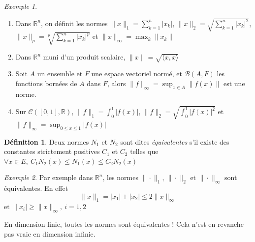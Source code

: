 \documentclass[]{article}
\theoremstyle{remark}
\newtheorem{myexmpl}{Exemple}
\theoremstyle{definition}
\newtheorem{mydef}{Définition}
\begin{document}
\begin{myexmpl}
	\leavevmode
	\begin{enumerate}
		\item Dans $\mathbb{R}^n$, on définit les normes $\displaystyle \|x\|_1= \sum_{k=1}^n |x_k|$, $\displaystyle \|x\|_2 =  \sqrt{\sum_{k=1}^n |x_k|^2}$, $\displaystyle \|x\|_p = \sqrt[p]{\sum_{k=1}^n |x_k|^p}$ et $\displaystyle \|x\|_\infty = \max_{k} \|x_k\|$
		\item Dans $\mathbb{R}^n$ muni d'un produit scalaire, $\|x\| = \sqrt{\langle x, x\rangle}$
		\item Soit $A$ un ensemble et $F$ une espace vectoriel normé, et $\mathcal{B}(A, F)$ les fonctions bornées de $A$ dans $F$, alors $\displaystyle \|f\|_\infty = \sup_{x \in A} \|f(x)\|$ est une norme.
		\item Sur $\mathcal{C}([0, 1], \mathbb{R})$, $\displaystyle \|f\|_1 = \int_{0}^{1}\left|f(x)\right|$, $\displaystyle \|f\|_2 = \sqrt{\int_{0}^{1}\left|f(x)\right|^2}$ et$\displaystyle \|f\|_\infty = \sup_{0 \leqslant x \leqslant 1}\left|f(x)\right|$
	\end{enumerate}
\end{myexmpl}

\begin{mydef}
	Deux normes $N_1$ et $N_2$ sont dites \textit{équivalentes} s'il existe des constantes strictement positives $C_1$ et $C_2$ telles que $\forall x \in E, ~ C_1 N_2(x) \leqslant N_1(x) \leqslant C_2 N_2(x)$
\end{mydef}

\begin{myexmpl}
	Par exemple dans $\mathbb{R}^n$, les normes $\|\cdot\|_1$, $\|\cdot\|_2$ et $\|\cdot\|_\infty$ sont équivalentes. En effet $$\|x\|_1=|x_1|+|x_2| \leqslant 2 \|x\|_\infty$$ et $\|x_i| \geqslant \|x\|_\infty, ~ i=1, 2$
\end{myexmpl}

En dimension finie, toutes les normes sont équivalentes ! Cela n'est en revanche pas vraie en dimension infinie.
\end{document}
